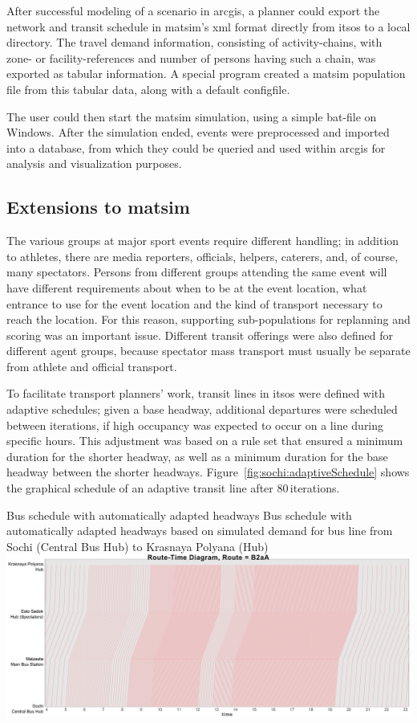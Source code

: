 After successful modeling of a scenario in \gls{arcgis}, a planner could export
the network and transit schedule in \gls{matsim}'s \gls{xml} format directly from \gls{itsos} to a
local directory. The travel demand information, consisting of activity-chains,
with zone- or facility-references and number of persons having such a
chain, was exported as tabular information. A special program created a \gls{matsim}
population file from this tabular data, along with a default \gls{configfile}.

The user could then start the \gls{matsim} simulation, using a simple bat-file
on Windows. After the simulation ended,  events were preprocessed and
imported into a database, from which they could be queried and used within \gls{arcgis}
for analysis and visualization purposes.

\subsection{Extensions to \protect\gls{matsim}}
The various groups at major sport events require different handling;
in addition to athletes, there are media reporters, officials,
helpers, caterers, and, of course, many spectators. Persons from different
groups attending the same event will have different requirements about when
to be at the event location, what entrance to use for the event
location and the kind of transport necessary to reach the location. For this reason,
supporting sub-populations for \gls{replanning} and scoring was an important issue.
Different transit offerings were also defined for different agent groups,
because spectator mass transport must usually be separate from
athlete and official transport.

To facilitate transport planners' work, transit lines in
\gls{itsos} were defined with adaptive schedules; given a base headway,
additional departures were scheduled between iterations, if high
occupancy was expected to occur on a line during specific hours. This adjustment was based
on a rule set that ensured a minimum duration for the shorter headway, as well
as a minimum duration for the base headway between the shorter headways.
Figure~\ref{fig:sochi:adaptiveSchedule} shows the graphical schedule of an
adaptive transit line after 80\,iterations.

\createfigure%
{Bus schedule with automatically adapted headways}%
{Bus schedule with automatically adapted headways based on simulated demand for
bus line from Sochi (Central Bus Hub) to Krasnaya Polyana (Hub)}%
{\label{fig:sochi:adaptiveSchedule}}%
{\includegraphics[width=1.\textwidth,angle=0]{./using/figures/sochi_adaptiveSchedule.pdf}}%
{}

